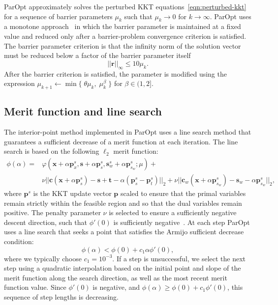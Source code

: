 \documentclass[12pt]{article}
\newcommand{\mb}{\mathbf}
\begin{document}
ParOpt approximately solves the perturbed KKT equations~\eqref{eqn:perturbed-kkt} for a sequence of barrier parameters $\mu_{k}$ such that $\mu_{k} \rightarrow 0$ for $k \rightarrow \infty$. 
ParOpt uses a monotone approach~\citet{Fiacco:McCormick:1990} in which the barrier parameter is maintained at a fixed value and reduced only after a barrier-problem convergence criterion is satisfied.
The barrier parameter criterion is that the infinity norm of the solution vector must be reduced below a factor of the barrier parameter itself
%
\begin{equation}
  \label{eqn:barrier-stopping-criterion}
  ||\mb{r}||_{\infty}  \le 10 \mu_{k}.
\end{equation}
After the barrier criterion is satisfied, the parameter is modified using the expression $\mu_{k+1} \leftarrow \min \{ \; \theta \mu_{k},\; \mu_{k}^{\beta}\;\}$ for $\beta \in (1, 2]$.

\subsection{Merit function and line search}

The interior-point method implemented in ParOpt uses a line search method that guarantees a sufficient decrease of a merit function at each iteration.
The line search is based on the following $\ell_{2}$ merit function:
%
\begin{equation}
  \label{eqn:merit-function}
  \begin{aligned}
    \phi(\alpha) = & \varphi(\mb{x} + \alpha\mb{p}_{x}^{s}, \mb{s} + \alpha\mb{p}_{s}^{s}, \mb{s}_{w}^{s} + \alpha\mb{p}^{s}_{s_{w}}; \mu) + \\
    & \nu ||\mb{c}(\mb{x} + \alpha\mb{p}_{s}^{s}) - \mb{s} + \mb{t}  - \alpha (\mb{p}_{s}^{s} - \mb{p}_{t}^{s})||_{2} +
    \nu ||\mb{c}_{w}(\mb{x} + \alpha\mb{p}^{s}_{s_{w}}) - \mb{s}_{w} - \alpha\mb{p}_{s_{w}}^{s}||_{2},
  \end{aligned}
\end{equation}
%
where $\mb{p}^{s}$ is the KKT update vector $\mb{p}$ scaled to ensure that the primal variables remain strictly within the feasible region and so that the dual variables remain positive.
The penalty parameter $\nu$ is selected to ensure a sufficiently negative descent direction, such that $\phi'(0)$ is sufficiently negative~\citep{Nocedal.Wright}. 
At each step ParOpt uses a line search that seeks a point that satisfies the Armijo sufficient decrease condition:
%
\begin{equation*}
  \phi(\alpha) < \phi(0) + c_{1} \alpha \phi'(0),
\end{equation*}
where we typically choose $c_{1} = 10^{-3}$. If a step is unsuccessful, we select the next step using a quadratic interpolation based on the initial point and slope of the merit function along the search direction, as well as the most recent merit function value. 
Since $\phi'(0)$ is negative, and $\phi(\alpha) \ge \phi(0) + c_{1} \phi'(0)$, this sequence of step lengths is decreasing.
\end{document}
